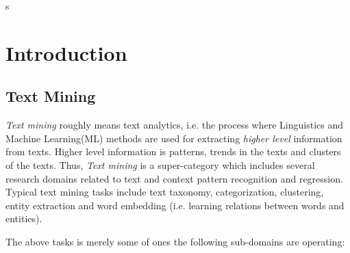 s%

\chapter{Introduction}

\label{chap:introduction}


\newcommand{\keyword}[1]{\textbf{#1}}
\newcommand{\tabhead}[1]{\textbf{#1}}
\newcommand{\code}[1]{\texttt{#1}}
\newcommand{\file}[1]{\texttt{\bfseries#1}}
\newcommand{\option}[1]{\texttt{\itshape#1}}


\section{Text Mining} \label{chap:introduction:sec:text_mining}

\textit{Text mining} roughly means text analytics, i.e. the process where Linguistics and Machine Learning(ML) methods are used for extracting \textit{higher level} information from texts. Higher level information is patterns, trends in the texts and clusters of the texts. Thus, \textit{Text mining} is a super-category which includes several research domains related to text and context pattern recognition and regression. Typical text mining tasks include text taxonomy, categorization, clustering, entity extraction and word embedding (i.e. learning relations between words and entities).

The above tasks is merely some of ones the following sub-domains are operating: 

